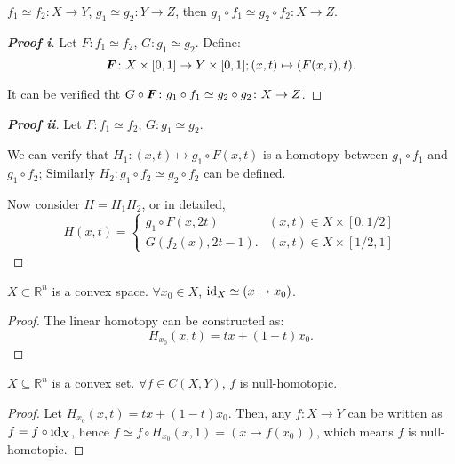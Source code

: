 \documentclass[openany]{book}
\begin{document}
\begin{theorem}%
    \label{theorem: Composition of homotopies}
    $f_1 \simeq f_2 \colon X \to Y$, $g_1 \simeq g_2 \colon Y \to Z$, then $g_1 \circ f_1 \simeq g_2 \circ f_2 \colon X \to Z$.
\end{theorem}
\begin{proof}[\textbf{Proof i}]
    Let $F \colon f_1 \simeq f_2$, $G \colon g_1 \simeq g_2$. 
    Define:
    \begin{equation*}
        \boldsymbol{F} \colon X \times [0, 1] \to Y \times [0, 1]; 
        (x, t) \mapsto (F(x, t), t). 
    \end{equation*}

    It can be verified tht $G \circ \boldsymbol{F} \colon g_1 \circ f_1 \simeq g_2 \circ g_2 \colon X \to Z$.
\end{proof}
\begin{proof}[\textbf{Proof ii}]
    Let $F \colon f_1 \simeq f_2$, $G \colon g_1 \simeq g_2$. 

    We can verify that $H_1 \colon (x, t) \mapsto g_1 \circ F(x, t)$ is a homotopy between $g_1 \circ f_1$ and $g_1 \circ f_2$;
    Similarly $H_2 \colon g_1 \circ f_2 \simeq g_2 \circ f_2$ can be defined.

    Now consider $H = H_1 H_2$, or in detailed,
    \begin{equation*}
        H(x, t) = \begin{cases}
            g_1 \circ F(x, 2t) & (x, t) \in X \times [0, 1/2] \\
            G(f_2(x), 2t - 1). & (x, t) \in X \times [1/2, 1]
        \end{cases}
    \end{equation*}
\end{proof}

\begin{lemma}
    $X \subset \mathbb R^n$ is a convex space.
    $\forall x_0 \in X$,
    $\operatorname{id}_X \simeq (x \mapsto x_0)$.
\end{lemma}
\begin{proof}
    The linear homotopy can be constructed as:
    \begin{equation*}
        H_{x_0} (x, t) = tx + (1 - t) x_0.
    \end{equation*}
\end{proof}

\begin{theorem}%
    \label{theorem: Continuous mappings from a convex set are null-homotopic}
    $X \subseteq \mathbb R^n$ is a convex set.
    $\forall f \in C(X, Y)$, $f$ is null-homotopic.
\end{theorem}
\begin{proof}
    Let $H_{x_0} (x, t) = tx + (1 - t) x_0$.
    Then, any $f \colon X \to Y$ can be written as $f = f \circ \operatorname{id}_X$, hence $f \simeq f \circ H_{x_0}(x, 1) = (x \mapsto f(x_0))$, which means $f$ is null-homotopic.
\end{proof}
\end{document}
